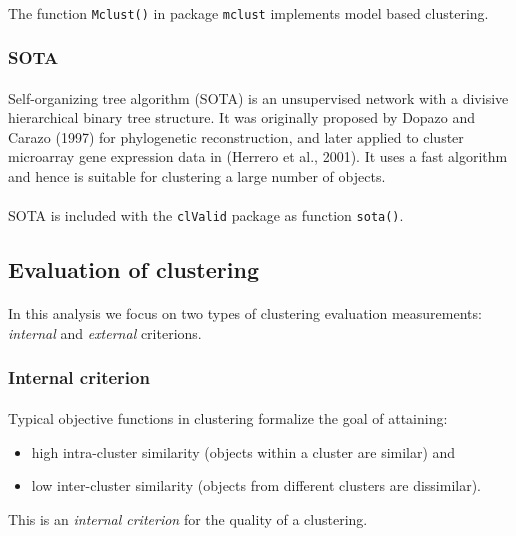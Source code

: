 \documentclass[10pt]{article}\usepackage[]{graphicx}\usepackage[]{color}
\begin{document}
\paragraph{}
The function \texttt{Mclust()} in package \texttt{mclust} implements model based
clustering.


\subsubsection{SOTA}
\paragraph{}
Self-organizing tree algorithm (SOTA) is an unsupervised network with a
divisive hierarchical binary tree structure. It was originally proposed by
Dopazo and Carazo (1997) for phylogenetic reconstruction, and later applied
to cluster microarray gene expression data in (Herrero et al., 2001). It uses a
fast algorithm and hence is suitable for clustering a large number of objects.
\paragraph{}
SOTA is included with the \texttt{clValid} package as function \texttt{sota()}.



\subsection{Evaluation of clustering}
\paragraph{}
In this analysis we focus on two types of clustering evaluation measurements: \textit{internal} and \textit{external} criterions.


\subsubsection{Internal criterion}
\paragraph{}
Typical objective functions in clustering formalize the goal of attaining: 
  \begin{itemize}
  \item high intra-cluster similarity (objects within a cluster are similar) and
  \item low inter-cluster similarity (objects from different clusters are dissimilar).
  \end{itemize}
This is an \textit{internal criterion} for the quality of a clustering. 
\end{document}
